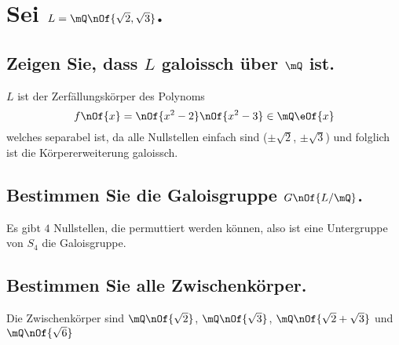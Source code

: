 \section{Sei $L = \mQ\nOf{\sqrt{2},\sqrt{3}}$.}
\subsection{Zeigen Sie, dass $L$ galoissch über $\mQ$ ist.}
$L$ ist der Zerfällungskörper des Polynoms
\begin{equation}
	f\nOf{x} = \nOf{x^2-2}\nOf{x^2-3} \in \mQ\eOf{x}
\end{equation}
welches separabel ist, da alle Nullstellen einfach sind ($\pm\sqrt{2}$, $\pm\sqrt{3}$) und folglich ist die Körpererweiterung galoissch.


\subsection{Bestimmen Sie die Galoisgruppe $G\nOf{L/\mQ}$.}
Es gibt $4$ Nullstellen, die permuttiert werden können, also ist eine Untergruppe von $S_4$ die Galoisgruppe.


\subsection{Bestimmen Sie alle Zwischenkörper.}
Die Zwischenkörper sind $\mQ\nOf{\sqrt{2}}$, $\mQ\nOf{\sqrt{3}}$, $\mQ\nOf{\sqrt{2}+\sqrt{3}}$ und $\mQ\nOf{\sqrt{6}}$